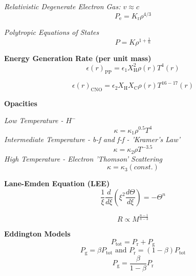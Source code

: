 \documentclass{article}
\begin{document}
\textit {Relativistic Degenerate Electron Gas: \(v \approx c\) }
\begin{equation}
P_\mathrm{e} = K_\mathrm{r} \rho^{4/3}
\end{equation}

\textit {Polytropic Equations of States}
\begin{equation}
P = K \rho^{1+\frac{1}{n}}
\end{equation}



\textbf {Energy Generation Rate (per unit mass)}
\begin{equation}
\epsilon(r)_\mathrm{PP} = \epsilon_1 X^2_\mathrm{H} \rho(r) T^4(r) 
\end{equation}

\begin{equation}
\epsilon(r)_\mathrm{CNO} = \epsilon_\mathrm{2} X_\mathrm{H} X_\mathrm{C} \rho(r) T^{16-17}(r)
\end{equation}

\textbf {Opacities}

\textit {Low Temperature - \(H^-\)}
\begin{equation}
\kappa = \kappa_\mathrm{1} \rho^{0.5} T^4
\end{equation}
\textit {Intermediate Temperature - b-f and f-f - 'Kramer's Law'}
\begin{equation}
\kappa = \kappa_\mathrm{2} \rho T^{-3.5}
\end{equation}
\textit {High Temperature - Electron 'Thomson' Scattering}
\begin{equation}
\kappa = \kappa_\mathrm{3} (const.)
\end{equation}

\textbf {Lane-Emden Equation (LEE)}
\begin{equation}
\frac{1}{\xi} \frac{d}{d\xi} \left( \xi^2 \frac{d\Theta}{d\xi} \right) = -\Theta^n
\end{equation}

\begin{equation}
R \propto M^\frac{n-1}{n-3}
\end{equation}

\textbf {Eddington Models}
\begin{equation}
P_\mathrm{tot} = P_\mathrm{r} + P_\mathrm{g}
\end{equation}
\begin{equation}
P_\mathrm{g} = \beta P_\mathrm{tot} \text{ and } P_\mathrm{r} = (1 - \beta) P_\mathrm{tot}
\end{equation}
\begin{equation}
P_\mathrm{g} = \frac{\beta}{1 - \beta} P_\mathrm{r}
\end{equation}
\end{document}
